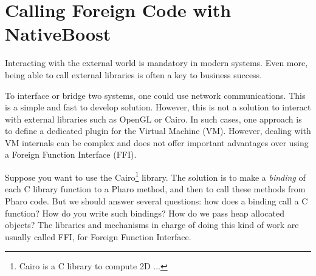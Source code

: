 \documentclass[a4paper,10pt,twoside]{book}
\begin{document}
	\sloppy
\fi


\newcommand{\NativeBoost}[0]{NativeBoost\xspace} %

\chapter{Calling Foreign Code with \NativeBoost}\label{cha:alien}


Interacting with the external world is mandatory in modern systems. 
Even more, being able to call external libraries is often a key to business success. 

To interface or bridge two systems, one could use network communications.
This is a simple and fast to develop solution.
However, this is not a solution to interact with external libraries such as OpenGL or Cairo. 
In such cases, one approach is to define a dedicated plugin for the Virtual Machine (VM). 
However, dealing with VM internals can be complex and does not offer important advantages over using a Foreign Function Interface (FFI).


Suppose you want to use the Cairo\footnote{Cairo is a C library to compute 2D ...} library. 
The solution is to make a \emph{binding} of each C library function to a Pharo method, and then to call these methods from Pharo code. 
But we should answer several questions: how does a binding call a C function? 
How do you write such bindings? 
How do we pass heap allocated objects? 
The libraries and mechanisms in charge of doing this kind of work are usually called FFI, for Foreign Function Interface. 


\end{document}
